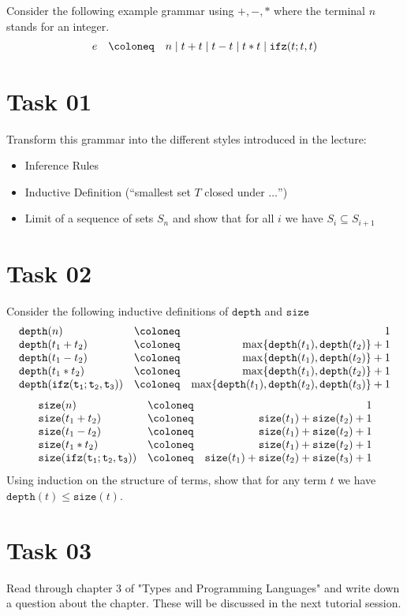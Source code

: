 Consider the following example grammar using $+,-,*$ where the terminal $n$ stands for an integer.
\[
  \begin{array}{l c r}
  e & \coloneq & n \mid t + t \mid t - t \mid t * t \mid  \mathtt{ifz}(t;t,t) 
  \end{array}
\]

\section*{Task 01}
Transform this grammar into the different styles introduced in the lecture:
\begin{itemize}
\item Inference Rules
\item Inductive Definition (``smallest set $T$ closed under $\dots$'')
\item Limit of a sequence of sets $S_n$ and show that for all $i$ we have $S_i\subseteq S_{i+1}$
\end{itemize}

\section*{Task 02}
Consider the following inductive definitions of $\mathtt{depth}$ and $\mathtt{size}$
\[
\begin{array}{l c r}
\mathtt{depth}(n) & \coloneq&  1\\
\mathtt{depth}(t_1+t_2) &\coloneq&\max\{\mathtt{depth}(t_1),\mathtt{depth}(t_2)\} + 1\\
\mathtt{depth}(t_1-t_2) &\coloneq& \max\{\mathtt{depth}(t_1),\mathtt{depth}(t_2)\} + 1\\
\mathtt{depth}(t_1*t_2) &\coloneq& \max\{\mathtt{depth}(t_1),\mathtt{depth}(t_2)\} + 1\\
\mathtt{depth}(\mathtt{ifz(t_1;t_2,t_3)}) &\coloneq& \max\{\mathtt{depth}(t_1),\mathtt{depth}(t_2),\mathtt{depth}(t_3)\} + 1
\end{array}
\]
\[
\begin{array}{l c r}
\mathtt{size}(n) & \coloneq&  1\\
\mathtt{size}(t_1+t_2) &\coloneq& \mathtt{size}(t_1)+\mathtt{size}(t_2) + 1\\
\mathtt{size}(t_1-t_2) &\coloneq& \mathtt{size}(t_1)+\mathtt{size}(t_2) + 1\\
\mathtt{size}(t_1*t_2) &\coloneq& \mathtt{size}(t_1)+\mathtt{size}(t_2) + 1\\
\mathtt{size}(\mathtt{ifz(t_1;t_2,t_3)}) &\coloneq& \mathtt{size}(t_1)+\mathtt{size}(t_2)+\mathtt{size}(t_3) + 1
\end{array}
\]
Using induction on the structure of terms, show that for any term $t$ we have $\mathtt{depth}(t) \leq \mathtt{size}(t)$.

\section*{Task 03}
Read through chapter 3 of "Types and Programming Languages" and write down a question about the chapter. 
These will be discussed in the next tutorial session.
